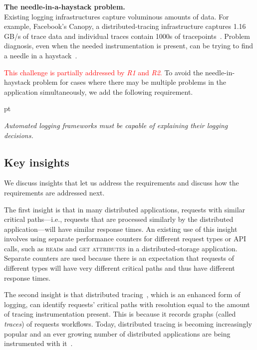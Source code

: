   \noindent\textbf{The needle-in-a-haystack problem.}
  \\
Existing logging infrastructures capture voluminous amounts of data.
For example, Facebook's Canopy, a distributed-tracing infrastructure
captures 1.16 GB/s of trace data and individual traces contain
1000s of tracepoints~\cite{Kaldor:2017gp}.  Problem diagnosis, even
when the needed instrumentation is present, can be trying to
find a needle in a haystack~\cite{Rabkin:2013wy}.

\textcolor{red}{
  This challenge is partially addressed by \textit{R1} and \textit{R2}.  
}
  To avoid the needle-in-haystack
problem for cases where there may be multiple problems in the
application simultaneously, we add the following requirement.

\begin{description}%
   pt \item[\textit{R3}] \textit{Automated logging
  frameworks must be capable of explaining their logging decisions.}

\end{description}


\subsection{Key insights}
\label{sec:motivaton:insights}

We discuss insights that let us address the requirements and
discuss how the requirements are addressed next.

The first insight is that in many distributed applications, requests
with similar critical paths---i.e., requests that are processed
similarly by the distributed application---will have similar response
times.  An existing use of this insight involves using separate
performance counters for different request types or API calls, such as
\textsc{read}s and \textsc{get attributes} in a distributed-storage
application.  Separate counters are used because there is an
expectation that requests of different types will have very different
critical paths and thus have different response times.

The second insight is that distributed
tracing~\cite{Sambasivan:2016bo, Parker, Shkuro}, which is an enhanced
form of logging, can identify requests' critical paths with resolution
equal to the amount of tracing instrumentation present.  This is
because it records graphs (called \textit{traces}) of requests
workflows.  Today, distributed tracing is becoming increasingly
popular and an ever growing number of distributed applications are
being instrumented with it~\cite{HDFS, CockroachDB, Weil:2006ti,
  Openstack, Kaldor:2017gp, Sigelman:2010uj, Mace2017survey}.

